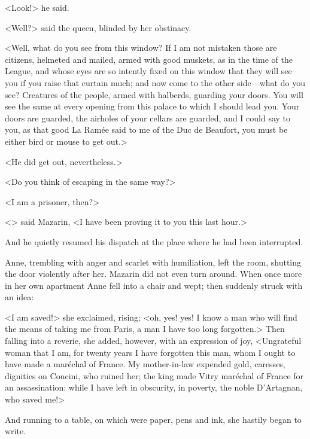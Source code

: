 <Look!> he said.

<Well?> said the queen, blinded by her obstinacy.

<Well, what do you see from this window? If I am not mistaken those are citizens, helmeted and mailed, armed with good muskets, as in the time of the League, and whose eyes are so intently fixed on this window that they will see you if you raise that curtain much; and now come to the other side—what do you see? Creatures of the people, armed with halberds, guarding your doors. You will see the same at every opening from this palace to which I should lead you. Your doors are guarded, the airholes of your cellars are guarded, and I could say to you, as that good La Ramée said to me of the Duc de Beaufort, you must be either bird or mouse to get out.>

<He did get out, nevertheless.>

<Do you think of escaping in the same way?>

<I am a prisoner, then?>

<> said Mazarin, <I have been proving it to you this last hour.>

And he quietly resumed his dispatch at the place where he had been interrupted.

Anne, trembling with anger and scarlet with humiliation, left the room, shutting the door violently after her. Mazarin did not even turn around. When once more in her own apartment Anne fell into a chair and wept; then suddenly struck with an idea:

<I am saved!> she exclaimed, rising; <oh, yes! yes! I know a man who will find the means of taking me from Paris, a man I have too long forgotten.> Then falling into a reverie, she added, however, with an expression of joy, <Ungrateful woman that I am, for twenty years I have forgotten this man, whom I ought to have made a maréchal of France. My mother-in-law expended gold, caresses, dignities on Concini, who ruined her; the king made Vitry maréchal of France for an assassination: while I have left in obscurity, in poverty, the noble D'Artagnan, who saved me!>

And running to a table, on which were paper, pens and ink, she hastily began to write. 
